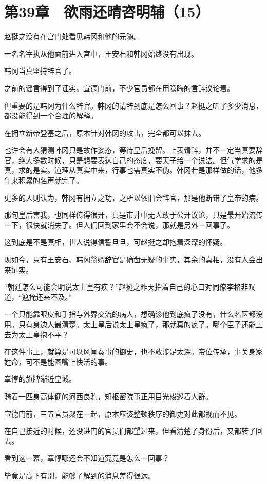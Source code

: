 \section{第39章　欲雨还晴咨明辅（15）}

赵挺之没有在宫门处看见韩冈和他的元随。

一名名宰执从他面前进入宫中，王安石和韩冈始终没有出现。

韩冈当真坚持辞官了。

之前的谣言得到了证实。宣德门前，不少官员都在用隐晦的言辞议论着。

但重要的是韩冈为什么辞官。韩冈的请辞到底是怎么回事？赵挺之听了多少消息，都没能得到一个合理的解释。

在拥立新帝登基之后，原本针对韩冈的攻击，完全都可以抹去。

也许会有人猜测韩冈只是故作姿态，等待皇后挽留。上表请辞，并不一定当真要辞官，绝大多数时候，只是想要表达自己的态度，要天子给一个说法。但气学求的是真，求的是实。道理从真实中来，行事也需真实不伪。韩冈若是那样做的话，他多年来积累的名声就完了。

更多的人则认为，韩冈有拥立之功，之所以依旧会辞官，那是他断错了皇帝的病。

那句皇后害我，也同样传得很开，只是市井中无人敢于公开议论，只是最开始流传一下，很快就消失了。但人们回到家里会不会说，那就是另外一回事了。

这到底是不是真相，世人说得信誓旦旦，可赵挺之却抱着深深的怀疑。

现如今，只有王安石、韩冈翁婿辞官是确凿无疑的事实，其余的真相，没有人会出来证实。

“朝廷怎么可能会明说太上皇有疾？”赵挺之昨天指着自己的心口对同僚李格非叹道，“遮掩还来不及。”

一个只能靠眼皮和手指与外界交流的病人，想确诊他到底疯了没有，什么名医都没用。只有身边人最清楚。太上皇后说太上皇疯了，那就真的疯了。哪个臣子还能上去为太上皇抱不平？

在这件事上，就算是可以风闻奏事的御史，也不敢涉足太深。帝位传承，事关身家姓命，可不是能图嘴上快活的事。

章惇的旗牌渐近皇城。

骑着一匹身高体健的河西良驹，知枢密院事正用目光梭巡着人群。

宣德门前，三五官员聚在一起，原本应该整顿秩序的御史对此都视而不见。

在自己接近的时候，还没进门的官员们都望过来，但看清楚了身份后，又都转了回去。

看到这一幕，章惇哪还会不知道究竟是怎么一回事？

毕竟是高下有别，能够了解到的消息差得很远。

